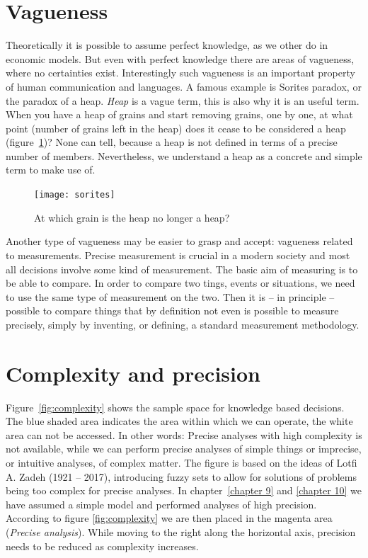 \documentclass[11pt,fleqn]{book} %
\begin{document}
\section{Vagueness}

Theoretically it is possible to assume perfect knowledge, as we other do in economic models. But even with perfect knowledge there are areas of vagueness, where no certainties exist. Interestingly such vagueness is an important property of human communication and languages. A famous example is Sorites paradox\cite{Fisher2000}, or the paradox of a heap. \textit{Heap} is a vague term, this is also why it is an useful term. When you have a heap of grains and start removing grains, one by one, at what point (number of grains left in the heap) does it cease to be considered a heap (figure~\ref{fig:sorites})? None can tell, because a heap is not defined in terms of a precise number of members. Nevertheless, we understand a heap as a concrete and simple term to make use of.

\begin{figure}[ht]
\centering
\texttt{[image: sorites]}
\caption{At which grain is the heap no longer a heap?}
\label{fig:sorites}
\end{figure}

Another type of vagueness may be easier to grasp and accept: vagueness related to measurements. Precise measurement is crucial in a modern society and most all decisions involve some kind of measurement. The basic aim of measuring is to be able to compare. In order to compare two tings, events or situations, we need to use the same type of measurement on the two. Then it is -- in principle -- possible to compare things that by definition not even is possible to measure precisely, simply by inventing, or defining, a standard measurement methodology.

\section{Complexity and precision}

Figure~\ref{fig:complexity} shows the sample space for knowledge based decisions. The blue shaded area indicates the area within which we can operate, the white area can not be accessed. In other words: Precise analyses with high complexity is not available, while we can perform precise analyses of simple things or imprecise, or intuitive analyses, of complex matter. The figure is based on the ideas of Lotfi A. Zadeh (1921 -- 2017)\cite{Zadeh1972}, introducing fuzzy sets to allow for solutions of problems being too complex for precise analyses. In chapter~\ref{chapter 9} and \ref{chapter 10} we have assumed a simple model and performed analyses of high precision. According to figure \ref{fig:complexity} we are then placed in the magenta area (\textit{Precise analysis}). While moving to the right along the horizontal axis, precision needs to be reduced as complexity increases.
\end{document}
